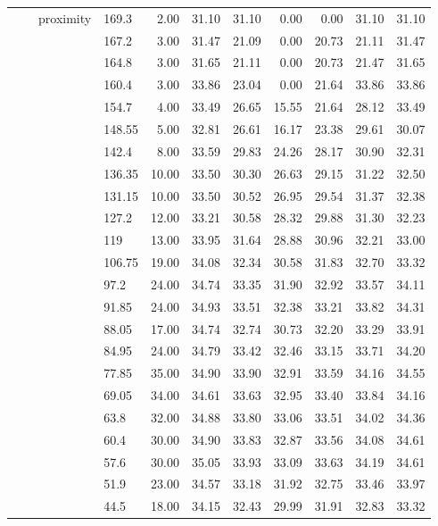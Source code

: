 \begin{longtable}{llllrrrrrrr}
   &  & proximity & 169.3 & 2.00 & 31.10 & 31.10 & 0.00 & 0.00 & 31.10 & 31.10 \\ 
   &  &  & 167.2 & 3.00 & 31.47 & 21.09 & 0.00 & 20.73 & 21.11 & 31.47 \\ 
   &  &  & 164.8 & 3.00 & 31.65 & 21.11 & 0.00 & 20.73 & 21.47 & 31.65 \\ 
   &  &  & 160.4 & 3.00 & 33.86 & 23.04 & 0.00 & 21.64 & 33.86 & 33.86 \\ 
   &  &  & 154.7 & 4.00 & 33.49 & 26.65 & 15.55 & 21.64 & 28.12 & 33.49 \\ 
   &  &  & 148.55 & 5.00 & 32.81 & 26.61 & 16.17 & 23.38 & 29.61 & 30.07 \\ 
   &  &  & 142.4 & 8.00 & 33.59 & 29.83 & 24.26 & 28.17 & 30.90 & 32.31 \\ 
   &  &  & 136.35 & 10.00 & 33.50 & 30.30 & 26.63 & 29.15 & 31.22 & 32.50 \\ 
   &  &  & 131.15 & 10.00 & 33.50 & 30.52 & 26.95 & 29.54 & 31.37 & 32.38 \\ 
   &  &  & 127.2 & 12.00 & 33.21 & 30.58 & 28.32 & 29.88 & 31.30 & 32.23 \\ 
   &  &  & 119 & 13.00 & 33.95 & 31.64 & 28.88 & 30.96 & 32.21 & 33.00 \\ 
   &  &  & 106.75 & 19.00 & 34.08 & 32.34 & 30.58 & 31.83 & 32.70 & 33.32 \\ 
   &  &  & 97.2 & 24.00 & 34.74 & 33.35 & 31.90 & 32.92 & 33.57 & 34.11 \\ 
   &  &  & 91.85 & 24.00 & 34.93 & 33.51 & 32.38 & 33.21 & 33.82 & 34.31 \\ 
   &  &  & 88.05 & 17.00 & 34.74 & 32.74 & 30.73 & 32.20 & 33.29 & 33.91 \\ 
   &  &  & 84.95 & 24.00 & 34.79 & 33.42 & 32.46 & 33.15 & 33.71 & 34.20 \\ 
   &  &  & 77.85 & 35.00 & 34.90 & 33.90 & 32.91 & 33.59 & 34.16 & 34.55 \\ 
   &  &  & 69.05 & 34.00 & 34.61 & 33.63 & 32.95 & 33.40 & 33.84 & 34.16 \\ 
   &  &  & 63.8 & 32.00 & 34.88 & 33.80 & 33.06 & 33.51 & 34.02 & 34.36 \\ 
   &  &  & 60.4 & 30.00 & 34.90 & 33.83 & 32.87 & 33.56 & 34.08 & 34.61 \\ 
   &  &  & 57.6 & 30.00 & 35.05 & 33.93 & 33.09 & 33.63 & 34.19 & 34.61 \\ 
   &  &  & 51.9 & 23.00 & 34.57 & 33.18 & 31.92 & 32.75 & 33.46 & 33.97 \\ 
   &  &  & 44.5 & 18.00 & 34.15 & 32.43 & 29.99 & 31.91 & 32.83 & 33.32 \\ 

\end{longtable}
